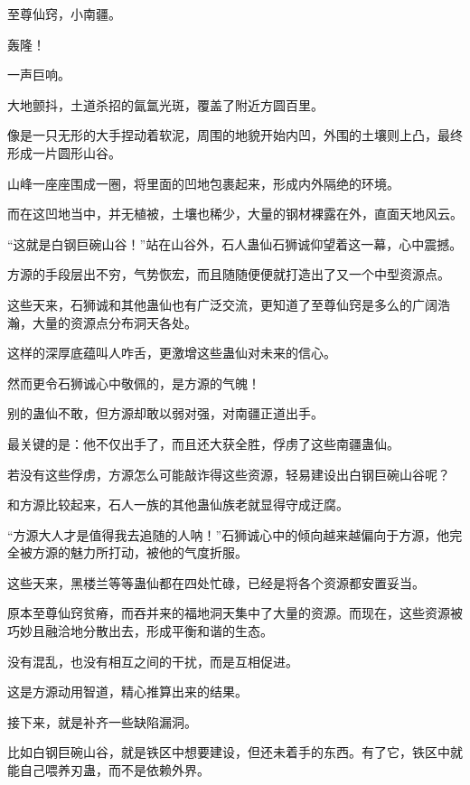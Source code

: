 
\begin{this_body}



至尊仙窍，小南疆。

轰隆！

一声巨响。

大地颤抖，土道杀招的氤氲光斑，覆盖了附近方圆百里。

像是一只无形的大手捏动着软泥，周围的地貌开始内凹，外围的土壤则上凸，最终形成一片圆形山谷。

山峰一座座围成一圈，将里面的凹地包裹起来，形成内外隔绝的环境。

而在这凹地当中，并无植被，土壤也稀少，大量的钢材裸露在外，直面天地风云。

“这就是白钢巨碗山谷！”站在山谷外，石人蛊仙石狮诚仰望着这一幕，心中震撼。

方源的手段层出不穷，气势恢宏，而且随随便便就打造出了又一个中型资源点。

这些天来，石狮诚和其他蛊仙也有广泛交流，更知道了至尊仙窍是多么的广阔浩瀚，大量的资源点分布洞天各处。

这样的深厚底蕴叫人咋舌，更激增这些蛊仙对未来的信心。

然而更令石狮诚心中敬佩的，是方源的气魄！

别的蛊仙不敢，但方源却敢以弱对强，对南疆正道出手。

最关键的是：他不仅出手了，而且还大获全胜，俘虏了这些南疆蛊仙。

若没有这些俘虏，方源怎么可能敲诈得这些资源，轻易建设出白钢巨碗山谷呢？

和方源比较起来，石人一族的其他蛊仙族老就显得守成迂腐。

“方源大人才是值得我去追随的人呐！”石狮诚心中的倾向越来越偏向于方源，他完全被方源的魅力所打动，被他的气度折服。

这些天来，黑楼兰等等蛊仙都在四处忙碌，已经是将各个资源都安置妥当。

原本至尊仙窍贫瘠，而吞并来的福地洞天集中了大量的资源。而现在，这些资源被巧妙且融洽地分散出去，形成平衡和谐的生态。

没有混乱，也没有相互之间的干扰，而是互相促进。

这是方源动用智道，精心推算出来的结果。

接下来，就是补齐一些缺陷漏洞。

比如白钢巨碗山谷，就是铁区中想要建设，但还未着手的东西。有了它，铁区中就能自己喂养刃蛊，而不是依赖外界。


\end{this_body}
